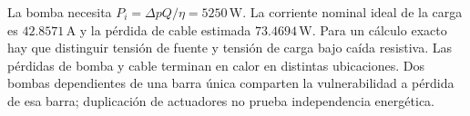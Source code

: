 La bomba necesita $P_i=\Delta pQ/\eta=5250\,\mathrm W$. La corriente nominal ideal de la carga es $42.8571\,\mathrm A$ y la pérdida de cable estimada $73.4694\,\mathrm W$. Para un cálculo exacto hay que distinguir tensión de fuente y tensión de carga bajo caída resistiva. Las pérdidas de bomba y cable terminan en calor en distintas ubicaciones. Dos bombas dependientes de una barra única comparten la vulnerabilidad a pérdida de esa barra; duplicación de actuadores no prueba independencia energética.

